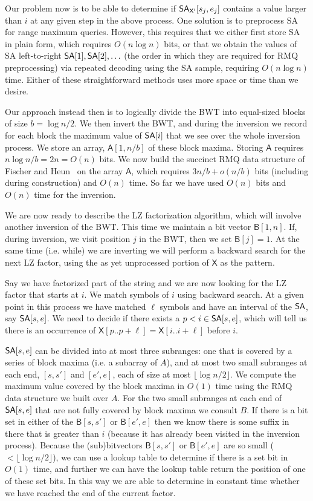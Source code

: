 \documentclass[11pt,runningheads]{llncs}
\def\SA{\mbox{\rm {\sf SA}}}
\def\X{\mathsf{X}}
\def\B{\mathsf{B}}
\def\A{\mathsf{A}}
\begin{document}
Our problem now is to be able to determine if $\SA_{\X'}[s_j,e_j]$ contains a value 
larger than $i$ at any given step in the above process. One solution is to preprocess 
SA for range maximum queries. However, this requires that we either first store SA in 
plain form, which requires $O(n\log n)$ bits, or that we obtain the values of SA 
left-to-right $\SA[1], \SA[2], \ldots$ (the order in which they are required for RMQ 
preprocessing) via repeated decoding using the SA sample, requiring $O(n\log n)$ time. 
Either of these straightforward methods uses more space or time than we desire. 

Our approach instead then is to logically divide the BWT into equal-sized blocks 
of size $b = \log n/2$. We then invert the BWT, and during the inversion we record for 
each block the maximum
value of $\SA[i]$ that we see over the whole inversion process. We store an array,
$\A[1,n/b]$ of these block maxima. Storing $\A$ requires $n\log n/b = 2n = O(n)$ bits.
We now build the succinct RMQ data structure of Fischer and Heun~\cite{FischerH11} on the
array $\A$, which requires $3n/b + o(n/b)$ bits (including during construction) and $O(n)$
time. So far we have used $O(n)$ bits and $O(n)$ time for the inversion.

We are now ready to describe the LZ factorization algorithm, which will involve another 
inversion of the BWT. This time we maintain a bit vector $\B[1,n]$. If, during
inversion, we visit position $j$ in the BWT, then we set $\B[j] = 1$. At the same
time (i.e. while) we are inverting we will perform a backward search for the next LZ factor,
using the as yet unprocessed portion of $\X$ as the pattern.

Say we have factorized part of the string and we are now looking for the LZ
factor that starts at $i$. We match symbols of $i$ using backward search. At a given point
in this process we have matched $\ell$ symbols and have an interval of the $\SA$, say $\SA[s,e]$.
We need to decide if there exists a $p < i \in \SA[s,e]$, which will tell us there is an
occurrence of $\X[p..p+\ell] = \X[i..i+\ell]$ before $i$.

$\SA[s,e]$ can be divided into at most three subranges: one that is covered by a series of block
maxima (i.e. a subarray of $A$), and at most two small subranges at each end, $[s,s']$
and $[e',e]$, each of size at most $\lfloor \log n/2\rfloor$. We compute the maximum value
covered by the block maxima in $O(1)$ time using the RMQ data structure we built over $A$.
For the two small subranges at each end of $\SA[s,e]$ that are not fully covered by block
maxima we consult $B$. If there is a bit set in either of the $\B[s,s']$ or $\B[e',e]$ then
we know there is some suffix in there that is greater than $i$ (because it has already been
visited in the inversion process). Because the (sub)bitvectors 
$\B[s,s']$ or $\B[e',e]$ are so small ($< \lfloor \log n/2 \rfloor$), we can use
a lookup table to determine if there is a set bit in $O(1)$ time, and further we can have
the lookup table return the position of one of these set bits. In this way we are able to 
determine in constant time whether we have reached the end of the current factor.
\end{document}
